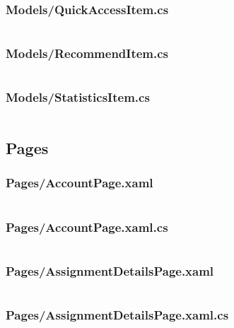 \documentclass[a4paper]{report}
\begin{document}
\subsubsection{Models/QuickAccessItem.cs}

\inputminted{csharp}{"../src/Algorithm Dynamics/Models/QuickAccessItem.cs"}

\subsubsection{Models/RecommendItem.cs}

\inputminted{csharp}{"../src/Algorithm Dynamics/Models/RecommendItem.cs"}

\subsubsection{Models/StatisticsItem.cs}

\inputminted{csharp}{"../src/Algorithm Dynamics/Models/StatisticsItem.cs"}

\subsection{Pages}

\subsubsection{Pages/AccountPage.xaml}

\inputminted{xml}{"../src/Algorithm Dynamics/Pages/AccountPage.xaml"}

\subsubsection{Pages/AccountPage.xaml.cs}

\inputminted{csharp}{"../src/Algorithm Dynamics/Pages/AccountPage.xaml.cs"}

\subsubsection{Pages/AssignmentDetailsPage.xaml}

\inputminted{xml}{"../src/Algorithm Dynamics/Pages/AssignmentDetailsPage.xaml"}

\subsubsection{Pages/AssignmentDetailsPage.xaml.cs}
\end{document}
